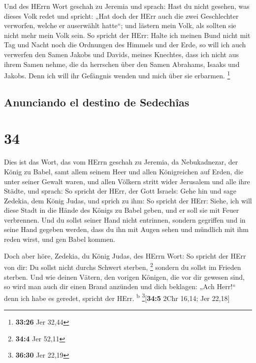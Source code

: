  Und des HErrn Wort geschah zu Jeremia und sprach:
 Hast du nicht gesehen, was dieses Volk redet und
spricht: „Hat doch der HErr auch die zwei Geschlechter verworfen, welche
er auserwählt hatte``; und lästern mein Volk, als sollten sie nicht mehr
mein Volk sein.  So spricht der HErr: Halte ich meinen
Bund nicht mit Tag und Nacht noch die Ordnungen des Himmels und der
Erde,  so will ich auch verwerfen den Samen Jakobs und
Davids, meines Knechtes, dass ich nicht aus ihrem Samen nehme, die da
herrschen über den Samen Abrahams, Isaaks und Jakobs. Denn ich will ihr
Gefängnis wenden und mich über sie erbarmen. \footnote{\textbf{33:26}
  Jer 32,44}

\hypertarget{anunciando-el-destino-de-sedechuxeeas}{%
\subsection{Anunciando el destino de
Sedechîas}\label{anunciando-el-destino-de-sedechuxeeas}}

\hypertarget{section-33}{%
\section{34}\label{section-33}}

 Dies ist das Wort, das vom HErrn geschah zu Jeremia, da
Nebukadnezar, der König zu Babel, samt allem seinem Heer und allen
Königreichen auf Erden, die unter seiner Gewalt waren, und allen Völkern
stritt wider Jerusalem und alle ihre Städte, und sprach: 
So spricht der HErr, der Gott Israels: Gehe hin und sage Zedekia, dem
König Judas, und sprich zu ihm: So spricht der HErr: Siehe, ich will
diese Stadt in die Hände des Königs zu Babel geben, und er soll sie mit
Feuer verbrennen.  Und du sollst seiner Hand nicht
entrinnen, sondern gegriffen und in seine Hand gegeben werden, dass du
ihn mit Augen sehen und mündlich mit ihm reden wirst, und gen Babel
kommen.

 Doch aber höre, Zedekia, du König Judas, des HErrn Wort:
So spricht der HErr von dir: Du sollst nicht durchs Schwert sterben,
\footnote{\textbf{34:4} Jer 52,11}  sondern du sollst im
Frieden sterben. Und wie deinen Vätern, den vorigen Königen, die vor dir
gewesen sind, so wird man auch dir einen Brand anzünden und dich
beklagen: „Ach Herr!{}`` denn ich habe es geredet, spricht der HErr.
\textsuperscript{b} \footnote{\textbf{36:30} Jer 22,19}{[}\textbf{34:5}
2Chr 16,14; Jer 22,18{]}

